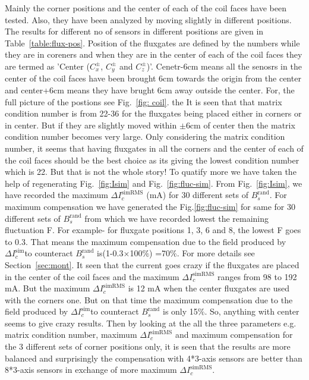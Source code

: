 Mainly the corner positions and the center of each of the coil faces  have been tested. Also, they have been analyzed by moving slightly in different positions. The results for different no of sensors in different positions are given in Table~\ref{table:flux-pos}. Position of the fluxgates are defined by the numbers while they are in coreners and when they are in the center of each of the coil faces they are termed as 'Center ($C_x^\pm$, $C_y^\pm$ and $C_z^\pm$)'. Cenetr-6cm means all the senosrs in the center of the coil faces have been brought 6cm towards the origin from the center and center+6cm means they have brught 6cm away outside the center. For, the full picture of the postions see Fig.~\ref{fig: coil}. the It is seen that that matrix condition number is from 22-36 for the fluxgates being placed either in corners or in center. But if they are slightly moved within $\pm$6cm of center then the matrix condition number becomes very large. Only considering the matrix condition number, it seems that having fluxgates in all the corners and the center of each of the coil faces should be the best choice as its giving the lowest condition number which is 22. But that is not the whole story! To quatify more we have taken the help of regenerating Fig.~\ref{fig:Isim} and Fig.~\ref{fig:fluc-sim}. From Fig.~\ref{fig:Isim}, we have recorded the maximum  $\Delta I_c^{\text{simRMS}}$ (mA) for 30 different sets of $B_s^{\text{rand}}$. For maximum compensation we have generated the Fig.\ref{fig:fluc-sim} for same for 30 different sets of $B_s^{\text{rand}}$ from which we have recorded lowest the remaining fluctuation F. For example- for fluxgate positions 1, 3, 6 and 8, the lowest F goes to 0.3. That means the maximum compensation due to the field produced by $\Delta I_c^{\text{sim}}$to counteract $B_s^{\text{rand}}$ is(1-0.3$\times$100$\%$) =70$\%$. For more details see Section~\ref{sec:mont}. It seen that the current goes crazy if the fluxgates are placed in the center of the coil faces and the maximum $\Delta I_c^{\text{simRMS}}$ ranges from 98 to 192 mA. But the maximum $\Delta I_c^{\text{simRMS}}$ is 12 mA when the center fluxgates are used with the corners one. But on that time the maximum compensation due to the field produced by $\Delta I_c^{\text{sim}}$to counteract $B_s^{\text{rand}}$ is only 15$\%$. So, anything with center seems to give crazy results. Then by looking at the all the three parameters e.g. matrix condition number, maximum $\Delta I_c^{\text{simRMS}}$ and maximum compensation for the 3 different sets of corner positions only, it is seen that the results are more balanced and surprisingly the compensation with 4*3-axis sensors are better than 8*3-axis sensors in exchange of more maximum $\Delta I_c^{\text{simRMS}}$.



